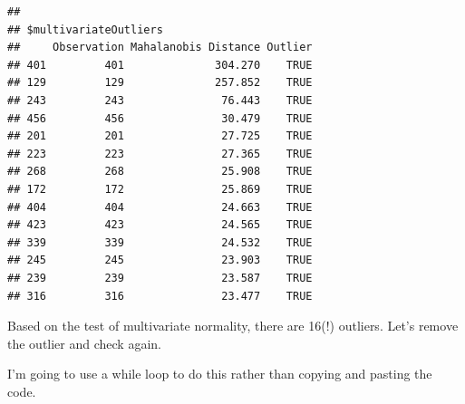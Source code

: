 \documentclass{article}\usepackage[]{graphicx}\usepackage[]{color}
\makeatletter
\newenvironment{kframe}{%
 \def\at@end@of@kframe{}%
 \ifinner\ifhmode%
  \def\at@end@of@kframe{\end{minipage}}%
  \begin{minipage}{\columnwidth}%
 \fi\fi%
 \def\FrameCommand##1{\hskip\@totalleftmargin \hskip-\fboxsep
 \colorbox{shadecolor}{##1}\hskip-\fboxsep
     \hskip-\linewidth \hskip-\@totalleftmargin \hskip\columnwidth}%
 \MakeFramed {\advance\hsize-\width
   \@totalleftmargin\z@ \linewidth\hsize
   \@setminipage}}%
 {\par\unskip\endMakeFramed%
 \at@end@of@kframe}
\newenvironment{knitrout}{}{} %
\makeatother
\begin{document}
\begin{knitrout}
\begin{kframe}
\begin{verbatim}
## 
## $multivariateOutliers
##     Observation Mahalanobis Distance Outlier
## 401         401              304.270    TRUE
## 129         129              257.852    TRUE
## 243         243               76.443    TRUE
## 456         456               30.479    TRUE
## 201         201               27.725    TRUE
## 223         223               27.365    TRUE
## 268         268               25.908    TRUE
## 172         172               25.869    TRUE
## 404         404               24.663    TRUE
## 423         423               24.565    TRUE
## 339         339               24.532    TRUE
## 245         245               23.903    TRUE
## 239         239               23.587    TRUE
## 316         316               23.477    TRUE
\end{verbatim}
\end{kframe}
\end{knitrout}

Based on the test of multivariate normality, there are 16(!) outliers. Let's remove the outlier and check again.

I'm going to use a while loop to do this rather than copying and pasting the code. 
\end{document}
